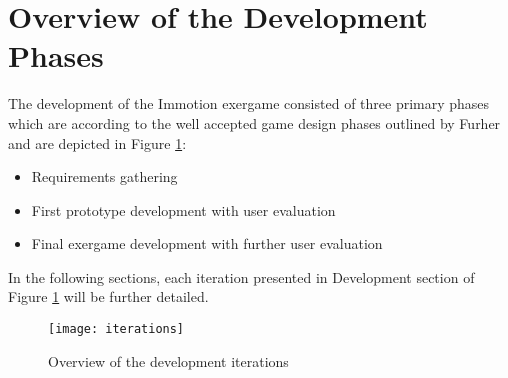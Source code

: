 \section{Overview of the Development Phases}
The development of the Immotion exergame consisted of three primary phases which are according to the well accepted game design phases outlined by Furher and are depicted in Figure \ref{fig:iterations}: 
\begin{itemize}
\item Requirements gathering 
\item First prototype development with user evaluation
\item Final exergame development with further user evaluation
\end{itemize}
In the following sections, each iteration presented in Development section of Figure \ref{fig:iterations} will be further detailed. 

\begin{figure}[h]
    \centering
    \texttt{[image: iterations]}
    \caption{Overview of the development iterations}
    \label{fig:iterations}
\end{figure}


